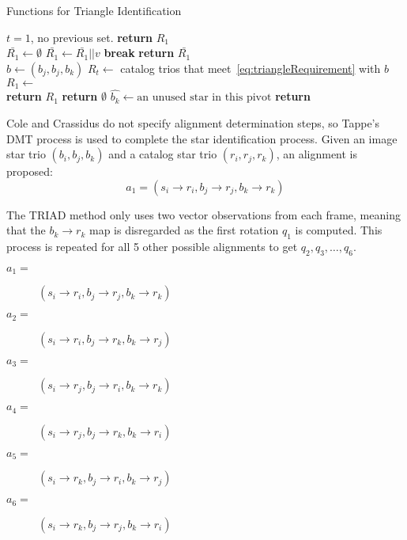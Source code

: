 \begin{algorithm}
    \caption{Functions for Triangle Identification} \label{algorithm:triangleHelper}
    \begin{algorithmic}[1]
         \Comment $t = 1$, no previous set.
        \State \textbf{return} $R_1$
        \EndIf
        \\
        \State $\bar{R_1} \gets \emptyset$
        \State $\bar{R_1} \gets \bar{R_1} || v$
        \State \textbf{break}
        \EndIf
        \EndFor
        \EndFor
        \State \textbf{return} $\bar{R_1}$
        \EndFunction
        \\
        \State $b \gets (b_j, b_j, b_k)$
        \State $R_t \gets $ catalog trios that meet~\eqref{eq:triangleRequirement} with $b$
        \State $R_1 \gets $ 
        \\
        \State \textbf{return} $R_1$
        \State \textbf{return} $\emptyset$
        \Else
        \State $\hat{b_k} \gets \text{an unused star in this pivot}$
        \State \textbf{return} 
        \EndIf
        \EndFunction
    \end{algorithmic}
\end{algorithm}

Cole and Crassidus do not specify alignment determination steps, so Tappe's DMT process is used to complete the star
identification process. Given an image star trio $(b_i, b_j, b_k)$ and a catalog star trio $(r_i, r_j, r_k)$, an
alignment is proposed:
\begin{equation}
    a_1 = (s_i \rightarrow r_i, b_j \rightarrow r_j, b_k \rightarrow r_k)
\end{equation}

The TRIAD method only uses two vector observations from each frame, meaning that the $b_k \rightarrow r_k$ map is
disregarded as the first rotation $q_1$ is computed. This process is repeated for all 5 other possible alignments to
get $q_2, q_3, \dots, q_6$.
\begin{description}
    \item [$a_1 = $] $(s_i \rightarrow r_i, b_j \rightarrow r_j, b_k \rightarrow r_k)$
    \item [$a_2 = $] $(s_i \rightarrow r_i, b_j \rightarrow r_k, b_k \rightarrow r_j)$
    \item [$a_3 = $] $(s_i \rightarrow r_j, b_j \rightarrow r_i, b_k \rightarrow r_k)$
    \item [$a_4 = $] $(s_i \rightarrow r_j, b_j \rightarrow r_k, b_k \rightarrow r_i)$
    \item [$a_5 = $] $(s_i \rightarrow r_k, b_j \rightarrow r_i, b_k \rightarrow r_j)$
    \item [$a_6 = $] $(s_i \rightarrow r_k, b_j \rightarrow r_j, b_k \rightarrow r_i)$
\end{description}

